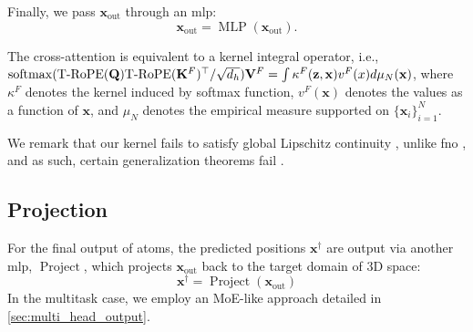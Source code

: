 Finally, we pass \(\mathbf{x}_{\text{out}}\) through an \gls{mlp}:
\begin{equation}
    \mathbf{x}_{\text{out}} = \operatorname{MLP}(\mathbf{x}_{\text{out}}).
\end{equation}

\begin{proposition}
\label{prop:kernel}
The cross-attention is equivalent to a kernel integral operator, i.e., ${\rm softmax}(\text{T-RoPE}(\mathbf Q) \text{T-RoPE}(\mathbf K^F)^\top/\sqrt{d_h}) \mathbf V^F = \int \kappa^F(\mathbf{z}, \mathbf{x}) v^F(x) d \mu_N(\mathbf{x})$, where $\kappa^F$ denotes the kernel induced by softmax function, $v^F(\mathbf x)$ denotes the values as a function of $\mathbf x$, and $\mu_N$ denotes the empirical measure supported on $\{ \mathbf{x}_i\}_{i=1}^N$. 
\end{proposition}


We remark that our kernel fails to satisfy global Lipschitz continuity \cite{delattre_efficient_2023}, unlike \gls{fno} \cite{li_fourier_2021}, and as such, certain generalization theorems fail \cite{le_mathematical_2024}.

\subsection{Projection}
\label{sec:project}
For the final output of \gls{atoms}, the predicted positions \(\mathbf{x}^\dagger\) are output via another \gls{mlp}, \(\operatorname{Project}\), which projects \(\mathbf{x}_\text{out}\) back to the target domain of \(3\)D space:
\begin{equation}
    \mathbf{x}^\dagger = \operatorname{Project}(\mathbf{x}_{\text{out}})
\end{equation}
In the multitask case, we employ an MoE-like approach detailed in \cref{sec:multi_head_output}.

